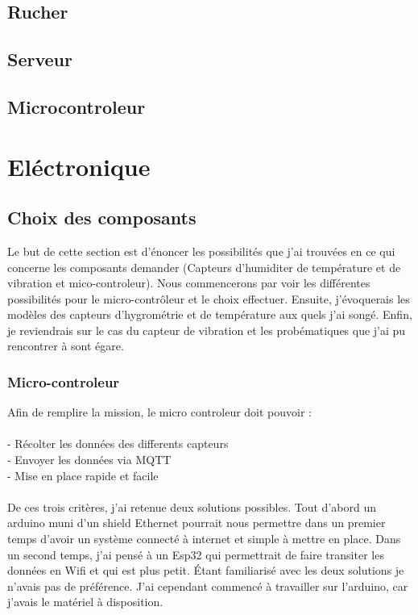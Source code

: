 \documentclass[11pt,french,a4paper]{article}
\begin{document}
\subsection{Rucher}
\subsection{Serveur}
\subsection{Microcontroleur}



\newpage
\section{Eléctronique}
\subsection{Choix des composants}

Le but de cette section est d'énoncer les possibilités que j'ai trouvées en ce qui concerne les composants demander (Capteurs d'humiditer de température et de vibration et mico-controleur). Nous commencerons par voir les différentes possibilités pour le micro-contrôleur et le choix effectuer. Ensuite, j'évoquerais les modèles des capteurs d'hygrométrie et de température aux quels j'ai songé. Enfin, je reviendrais sur le cas du capteur de vibration et les probématiques que j'ai pu rencontrer à sont égare.

\subsubsection{Micro-controleur}

Afin de remplire la mission, le micro controleur doit pouvoir :\\
\\
	- Récolter les données des differents capteurs\\
	- Envoyer les données via MQTT\\
	- Mise en place rapide et facile\\
	\\
De ces trois critères, j'ai retenue deux solutions possibles. 
Tout d'abord un arduino muni d'un shield Ethernet pourrait nous permettre dans un premier temps d'avoir un système 
connecté à internet et simple à mettre en place.
Dans un second temps, j'ai pensé à un Esp32 qui permettrait de faire transiter les données en Wifi et qui est plus petit. 
Étant familiarisé avec les deux solutions je n'avais pas de préférence. J'ai cependant commencé à travailler sur l'arduino, car j'avais
le matériel à disposition.
\end{document}
